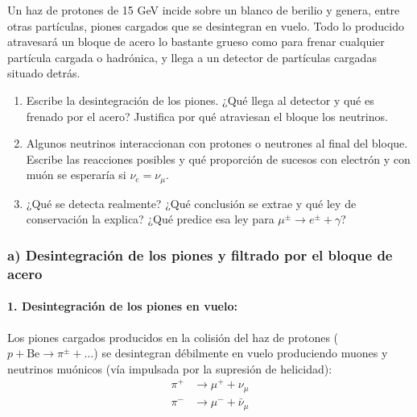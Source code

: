 \newpage
\begin{problema}
Un haz de protones de 15 GeV incide sobre un blanco de berilio y genera, entre otras partículas, piones cargados que se desintegran en vuelo. Todo lo producido atravesará un bloque de acero lo bastante grueso como para frenar cualquier partícula cargada o hadrónica, y llega a un detector de partículas cargadas situado detrás.

\begin{enumerate}[label=\alph*)]
    \item Escribe la desintegración de los piones. ¿Qué llega al detector y qué es frenado por el acero? Justifica por qué atraviesan el bloque los neutrinos.
    \item Algunos neutrinos interaccionan con protones o neutrones al final del bloque. Escribe las reacciones posibles y qué proporción de sucesos con electrón y con muón se esperaría si $\nu_e = \nu_\mu$.
    \item ¿Qué se detecta realmente? ¿Qué conclusión se extrae y qué ley de conservación la explica? ¿Qué predice esa ley para $\mu^\pm \to e^\pm + \gamma$?
\end{enumerate}

\tcblower

\subsubsection*{a) Desintegración de los piones y filtrado por el bloque de acero}

\paragraph{1. Desintegración de los piones en vuelo:}
Los piones cargados producidos en la colisión del haz de protones ($p + \text{Be} \to \pi^\pm + \dots$) se desintegran débilmente en vuelo produciendo muones y neutrinos muónicos (vía impulsada por la supresión de helicidad):
\begin{align*}
\pi^+ &\longrightarrow \mu^+ + \nu_\mu \\
\pi^- &\longrightarrow \mu^- + \bar{\nu}_\mu
\end{align*}


\end{problema}
